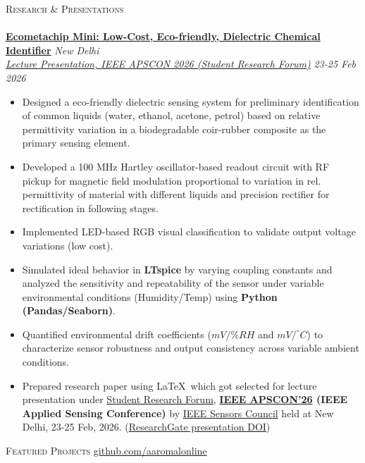 \documentclass[a4paper]{article}
\newcommand{\lineunder} {
    \vspace*{-8pt} \\
    \hspace*{-18pt} \hrulefill \\
}
\newcommand{\header} [1] {
    {\hspace*{-18pt}\vspace*{6pt} \textsc{#1}}
    \vspace*{-6pt} \lineunder
}
\begin{document}
\header{Research \& Presentations}
\textbf{\href{https://github.com/aaromalonline/ecometachip}{Ecometachip Mini: Low-Cost, Eco-friendly, Dielectric Chemical Identifier}} \hfill \textit{New Delhi} \\
\textit{\href{https://epapers2.org/apscon2026/ESR/paper_details.php?paper_id=6101}{Lecture Presentation, IEEE APSCON 2026 (Student Research Forum)}} \hfill \textit{23-25 Feb 2026}
\begin{itemize} \itemsep 1pt
    \item Designed a eco-friendly dielectric sensing system for preliminary identification of common liquids (water, ethanol, acetone, petrol) based on relative permittivity variation in a biodegradable coir-rubber composite as the primary sensing element.
    \item Developed a 100 MHz Hartley oscillator-based readout circuit with RF pickup for magnetic field modulation proportional to variation in rel. permittivity of material with different liquids and precision rectifier for rectification in following stages.
    \item Implemented LED-based RGB visual classification to validate output voltage variations (low cost).
    \item Simulated ideal behavior in \textbf{LTspice} by varying coupling constants and analyzed the sensitivity and repeatability of the sensor under variable environmental conditions (Humidity/Temp) using \textbf{Python (Pandas/Seaborn)}.
    \item Quantified environmental drift coefficients ($mV/\%RH$ and $mV/^\circ C$) to characterize sensor robustness and output consistency across variable ambient conditions.
    \item Prepared research paper using \LaTeX\ which got selected for lecture presentation under \href{https://epapers2.org/apscon2026/ESR/session_view.php?session_id=35}{Student Research Forum}, \textbf{\href{https://2026.ieee-apscon.org/}{IEEE APSCON'26} (IEEE Applied Sensing Conference)} by \href{https://ieee-sensors.org/}{IEEE Sensors Council} held at New Delhi, 23-25 Feb, 2026. (\href{https://www.researchgate.net/publication/401928480_Certificate_for_presentation}{ResearchGate presentation DOI})
\end{itemize}
\vspace*{2mm}

{\hspace*{-18pt}\vspace*{6pt} \textsc{Featured Projects} \hfill \href{https://github.com/aaromalonline}{github.com/aaromalonline}}
\vspace*{-6pt} \lineunder
\end{document}
